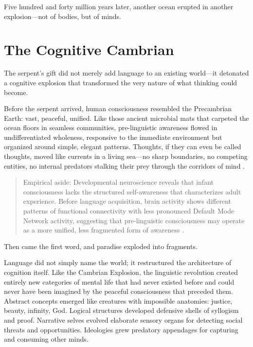 Five hundred and forty million years later, another ocean erupted in another explosion—not of bodies, but of minds.

\section{The Cognitive Cambrian}

The serpent's gift did not merely add language to an existing world—it detonated a cognitive explosion that transformed the very nature of what thinking could become.

Before the serpent arrived, human consciousness resembled the Precambrian Earth: vast, peaceful, unified. Like those ancient microbial mats that carpeted the ocean floors in seamless communities, pre-linguistic awareness flowed in undifferentiated wholeness, responsive to the immediate environment but organized around simple, elegant patterns. Thoughts, if they can even be called thoughts, moved like currents in a living sea—no sharp boundaries, no competing entities, no internal predators stalking their prey through the corridors of mind \parencite{damasio2010self}.

\begin{quote}\small
Empirical aside: Developmental neuroscience reveals that infant consciousness lacks the structured self-awareness that characterizes adult experience. Before language acquisition, brain activity shows different patterns of functional connectivity with less pronounced Default Mode Network activity, suggesting that pre-linguistic consciousness may operate as a more unified, less fragmented form of awareness \parencite{gao2009evidence,gao2016development}.
\end{quote}

Then came the first word, and paradise exploded into fragments.

Language did not simply name the world; it restructured the architecture of cognition itself. Like the Cambrian Explosion, the linguistic revolution created entirely new categories of mental life that had never existed before and could never have been imagined by the peaceful consciousness that preceded them. Abstract concepts emerged like creatures with impossible anatomies: justice, beauty, infinity, God. Logical structures developed defensive shells of syllogism and proof. Narrative selves evolved elaborate sensory organs for detecting social threats and opportunities. Ideologies grew predatory appendages for capturing and consuming other minds.

